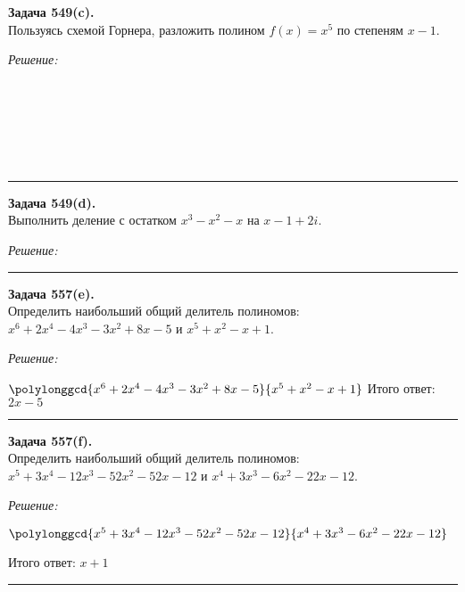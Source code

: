\documentclass[a4paper, 12pt]{article}
\newenvironment{problem}[2][Задача]
    { \begin{mdframed}[backgroundcolor=gray!10] \textbf{#1 #2.} \\}
    {  \end{mdframed}}
\newenvironment{solution}
    {\textit{Решение: }}
    {\noindent\rule{7in}{1.5pt}}
\begin{document}
\begin{problem}{549(c)}
Пользуясь схемой Горнера, разложить полином $f(x)=x^5$ по степеням $x-1$.
\end{problem}
\begin{solution}

 \\
 \\
 \\
 \\
 \\

\end{solution} 

\begin{problem}{549(d)}
Выполнить деление с остатком $x^3-x^2-x$ на $x-1+2i$.
\end{problem}
\begin{solution}

\end{solution} 

\begin{problem}{557(e)}
Определить наибольший общий делитель полиномов: $x^6+2x^4-4x^3-3x^2+8x-5$ и $x^5+x^2-x+1$.
\end{problem}
\begin{solution}

$
\polylonggcd{x^6+2x^4-4x^3-3x^2+8x-5}{x^5+x^2-x+1} \\
$
Итого ответ: $2x-5$


\end{solution} 

\begin{problem}{557(f)}
Определить наибольший общий делитель полиномов: $x^5+3x^4-12x^3-52x^2-52x-12$ и $x^4+3x^3-6x^2-22x-12$.
\end{problem}
\begin{solution}

  $
\polylonggcd{x^5+3x^4-12x^3-52x^2-52x-12}{x^4+3x^3-6x^2-22x-12} \\
$

Итого ответ: $x + 1$

\end{solution} 
\end{document}
